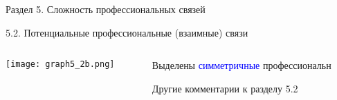 \begin{frame}{Раздел 5. Сложность профессиональных связей}

{\large 5.2. Потенциальные профессиональные (взаимные) связи}

\begin{columns}[T] %
\begin{column}{0.7\textwidth} %
\centering
          \texttt{[image: graph5\_2b.png]}
\end{column}
\begin{column}{0.3\textwidth} %

\small
Выделены \textcolor{blue}{симметричные} профессиональн

Другие комментарии к разделу 5.2

\end{column}
\end{columns}
\end{frame}


